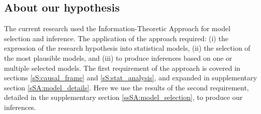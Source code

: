 \subsection{About our hypothesis} \label{sS:results_hypothesis}
%
The current research used the Information-Theoretic Approach \citep{Anderson_2008, Chamberlain_1965} for model selection and inference. The application of the approach required: (i) the expression of the research hypothesis into statistical models, (ii) the selection of the most plausible models, and (iii) to produce inferences based on one or multiple selected models. The first requirement of the approach is covered in sections \ref{sS:causal_frame} and \ref{sS:stat_analysis}, and expanded in supplementary section \ref{sSA:model_details}. Here we use the results of the second requirement, detailed in the supplementary section \ref{ssSA:model_selection}, to produce our inferences. 

